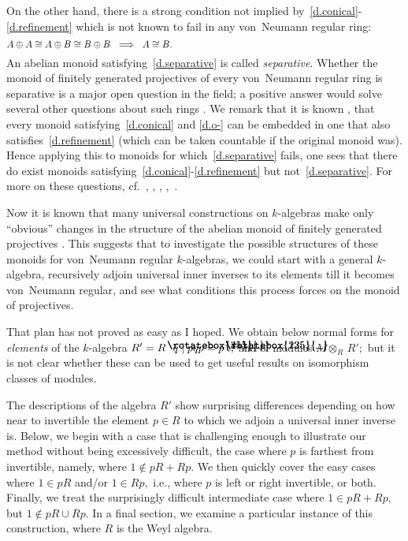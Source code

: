 \documentclass{amsart}
\DeclareRobustCommand{\lang}{\begin{picture}(5,7)
\put(1.2,2.5){\rotatebox{45}{\line(1,0){6.0}}}
\put(1.2,2.5){\rotatebox{315}{\line(1,0){6.0}}}
\end{picture}\kern.16em}
\DeclareRobustCommand{\rang}{\kern.1em\begin{picture}(5,7)
\put(.1,2.5){\rotatebox{135}{\line(1,0){6.0}}}
\put(.1,2.5){\rotatebox{225}{\line(1,0){6.0}}}
\end{picture}}
\begin{document}
On the other hand, there is a strong condition not implied
by~\eqref{d.conical}-\eqref{d.refinement} which is not known to
fail in any von~Neumann regular ring:
\begin{equation}\begin{minipage}[c]{35pc}\label{d.separative}
$A\oplus A\cong A\oplus B\cong B\oplus B\ \implies\ A\cong B.$
\end{minipage}\end{equation}
An abelian monoid satisfying~\eqref{d.separative}
is called {\em separative}.
Whether the monoid of finitely generated projectives
of every von~Neumann regular ring is separative
is a major open question in the field; a
positive answer would solve several other questions about
such rings \cite{separative}.
We remark that it is known \cite{FW}, \cite[\S4]{A+E}
that every monoid satisfying~\eqref{d.conical}
and \eqref{d.o-} can be embedded in one that also
satisfies~\eqref{d.refinement} (which
can be taken countable if the original monoid was).
Hence applying this to monoids for which~\eqref{d.separative} fails,
one sees that there do exist
monoids satisfying~\eqref{d.conical}-\eqref{d.refinement}
but not~\eqref{d.separative}.
For more on these questions, cf.\ \cite{Ara}, \cite{A+E},
\cite{A+G}, \cite{A+G2},~\cite{separative}.

Now it is known that many universal constructions
on $\!k\!$-algebras make
only ``obvious'' changes in the structure of the abelian monoid of
finitely generated projectives \cite{cP} \cite{cPu} \cite{u_deriv&}.
This suggests that to investigate the possible structures of these
monoids for von~Neumann regular $\!k\!$-algebras,
we could start with a general $\!k\!$-algebra,
recursively adjoin universal inner inverses to its elements
till it becomes von~Neumann regular, and see what
conditions this process forces on the monoid of projectives.

That plan has not proved as easy as I hoped.
We obtain below normal forms for {\em elements}
of the $\!k\!$-algebra $R'=R\lang q\mid pqp=p\rang,$
and of modules $M\otimes_R\,R';$ but it is not clear whether these can
be used to get useful results on isomorphism classes of modules.

The descriptions of the algebra $R'$ show surprising differences
depending on how near to invertible the element $p\in R$ to which we
adjoin a universal inner inverse is.
Below, we begin with a case that is challenging enough to
illustrate our method without being excessively difficult,
the case where $p$ is farthest from invertible,
namely, where $1\notin pR+Rp.$
We then quickly cover the easy cases where $1\in pR$
and/or $1\in Rp,$ i.e., where $p$ is left or right invertible, or both.
Finally, we treat the surprisingly difficult intermediate case
where $1\in pR+Rp,$ but $1\notin pR\cup Rp.$
In a final section, we examine a particular instance of this
construction, where $R$ is the Weyl algebra.
\end{document}
